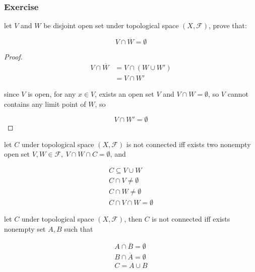 \subsubsection{Exercise}

\begin{exercise}
    let $V$ and $W$ be disjoint open set under topological space $(X, \mathcal{F})$, prove that:

    \[
        V \cap \overline{W} = \emptyset
    \]
\end{exercise}

\begin{proof}
    \begin{align*}
        V \cap \overline{W} &= V \cap (W \cup W') \\
        & = V \cap W'
    \end{align*}

    since $V$ is open, for any $x \in V$, exists an open set $V$ and $V \cap W = \emptyset$, so $V$
    cannot contains any limit point of $W$, so 

    \[
        V \cap W' = \emptyset
    \]
\end{proof}

\begin{definition}
    let $C$ under topological space $(X, \mathcal{F})$ is not connected iff exists two nonempty open set $V, W \in \mathcal{F},\: V \cap W \cap C = \emptyset$, and

    \begin{align*}
        C \subseteq V \cup W \\
        C \cap V \ne \emptyset \\ 
        C \cap W \ne \emptyset \\ 
        C \cap V \cap W = \emptyset
    \end{align*}
\end{definition}

\begin{exercise}
    let $C$ under topological space $(X, \mathcal{F})$, then $C$ is not connected iff exists nonempty set $A, B$  such that

    \begin{align*}
        A \cap \overline{B} = \emptyset \\
        B \cap \overline{A} = \emptyset \\
        C = A \cup B
    \end{align*}
\end{exercise}

